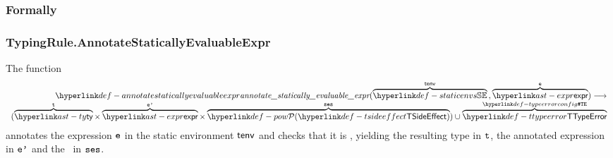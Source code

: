 \subsubsection{Formally}
\begin{mathpar}
\end{mathpar}

\begin{mathpar}
\end{mathpar}

\begin{mathpar}
\end{mathpar}

\begin{mathpar}
\end{mathpar}

\subsubsection{TypingRule.AnnotateStaticallyEvaluableExpr\label{sec:TypingRule.AnnotateStaticallyEvaluableExpr}}
\hypertarget{def-annotatestaticallyevaluableexpr}{}
The function
\[
\begin{array}{r}
  \annotatestaticallyevaluableexpr(\overname{\staticenvs}{\tenv} \aslsep \overname{\expr}{\ve}) \aslto \\
  (\overname{\ty}{\vt}\times\overname{\expr}{\vep}\times\overname{\TSideEffectSet}{\vses}) \cup \overname{\TTypeError}{\TypeErrorConfig}
\end{array}
\]
annotates the expression $\ve$ in the static environment $\tenv$ and checks that it is \staticallyevaluable,
yielding the resulting type in $\vt$, the annotated expression in $\vep$ and the \sideeffectsetterm\ in $\vses$.
\ProseOtherwiseTypeError

